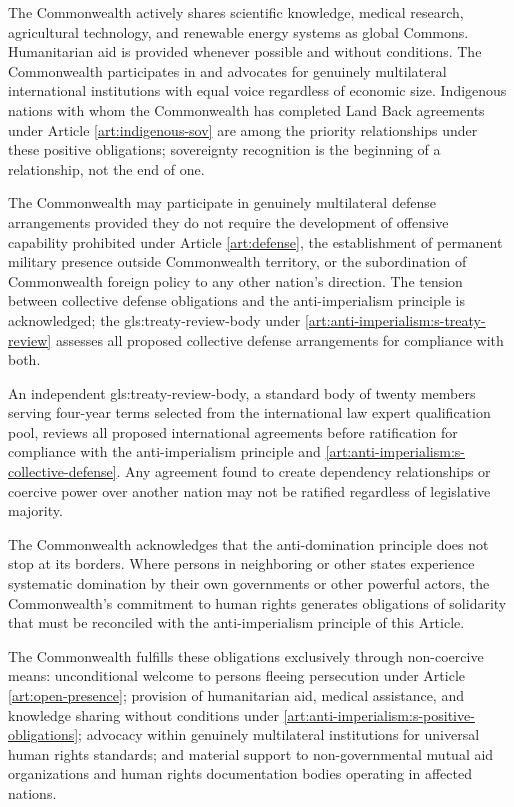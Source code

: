 The Commonwealth actively shares scientific knowledge, medical research, agricultural technology, and renewable energy systems as global Commons. Humanitarian aid is provided whenever possible and without conditions. The Commonwealth participates in and advocates for genuinely multilateral international institutions with equal voice regardless of economic size. Indigenous nations with whom the Commonwealth has completed Land Back agreements under Article \ref{art:indigenous-sov} are among the priority relationships under these positive obligations; sovereignty recognition is the beginning of a relationship, not the end of one.

The Commonwealth may participate in genuinely multilateral defense arrangements provided they do not require the development of offensive capability prohibited under Article \ref{art:defense}, the establishment of permanent military presence outside Commonwealth territory, or the subordination of Commonwealth foreign policy to any other nation's direction. The tension between collective defense obligations and the anti-imperialism principle is acknowledged; the \gls{gls:treaty-review-body} under \ref{art:anti-imperialism:s-treaty-review} assesses all proposed collective defense arrangements for compliance with both.

An independent \gls{gls:treaty-review-body}, a standard body of twenty members serving four-year terms selected from the international law expert qualification pool, reviews all proposed international agreements before ratification for compliance with the anti-imperialism principle and \ref{art:anti-imperialism:s-collective-defense}. Any agreement found to create dependency relationships or coercive power over another nation may not be ratified regardless of legislative majority.

The Commonwealth acknowledges that the anti-domination principle does not stop at its borders. Where persons in neighboring or other states experience systematic domination by their own governments or other powerful actors, the Commonwealth's commitment to human rights generates obligations of solidarity that must be reconciled with the anti-imperialism principle of this Article.

The Commonwealth fulfills these obligations exclusively through non-coercive means: unconditional welcome to persons fleeing persecution under Article \ref{art:open-presence}; provision of humanitarian aid, medical assistance, and knowledge sharing without conditions under \ref{art:anti-imperialism:s-positive-obligations}; advocacy within genuinely multilateral institutions for universal human rights standards; and material support to non-governmental mutual aid organizations and human rights documentation bodies operating in affected nations.

